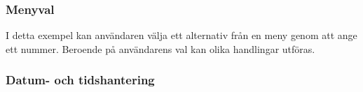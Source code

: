 \begin{Shaded}
\begin{Highlighting}[]
\OperatorTok{();}
    \OperatorTok{\}}
\OperatorTok{\}}
\end{Highlighting}
\end{Shaded}

\hypertarget{menyval}{%
\subsubsection{Menyval}\label{menyval}}

\hypertarget{cb3}{}
\begin{Shaded}
\begin{Highlighting}[]
\OperatorTok{(}\OperatorTok{);}
\OperatorTok{(}\OperatorTok{);}
\OperatorTok{(}\OperatorTok{);}
\OperatorTok{(}\OperatorTok{);}
\OperatorTok{=} \OperatorTok{(}\OperatorTok{());}
 \OperatorTok{(}\OperatorTok{==} \OperatorTok{)} \OperatorTok{\{}
\OperatorTok{\}}   \OperatorTok{(}\OperatorTok{==} \OperatorTok{)} \OperatorTok{\{}
\OperatorTok{\}}   \OperatorTok{(}\OperatorTok{==} \OperatorTok{)} \OperatorTok{\{}
\OperatorTok{\}}  \OperatorTok{\{}
    \OperatorTok{(}\OperatorTok{);}
\OperatorTok{\}}
\end{Highlighting}
\end{Shaded}

I detta exempel kan användaren välja ett alternativ från en meny genom
att ange ett nummer. Beroende på användarens val kan olika handlingar
utföras.

\hypertarget{datum--och-tidshantering}{%
\subsubsection{Datum- och
tidshantering}\label{datum--och-tidshantering}}

